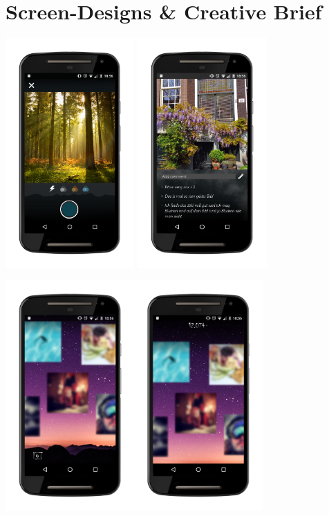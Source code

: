 \chapter{Screen-Designs \& Creative Brief}

\begin{center}
\includegraphics[width=0.37\textwidth]{assets/Screen-Camera.jpg}
\includegraphics[width=0.37\textwidth]{assets/Screen-Image.jpg}

\includegraphics[width=0.74\textwidth]{assets/Screen-Home.jpg}
\end{center}

